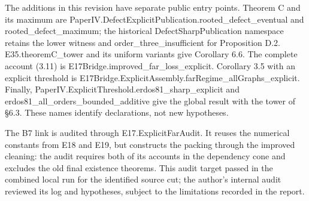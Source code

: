 \documentclass[english,11pt,a4paper]{article}
\begin{document}
The additions in this revision have separate public entry points. Theorem C and its maximum are {\ttfamily\small PaperIV.\discretionary{\hbox{\ensuremath{\hookrightarrow}}}{}{}DefectExplic\discretionary{\hbox{\ensuremath{\hookrightarrow}}}{}{}itPublicatio\discretionary{\hbox{\ensuremath{\hookrightarrow}}}{}{}n.\discretionary{\hbox{\ensuremath{\hookrightarrow}}}{}{}rooted\_\discretionary{\hbox{\ensuremath{\hookrightarrow}}}{}{}defect\_\discretionary{\hbox{\ensuremath{\hookrightarrow}}}{}{}eventual} and {\ttfamily\small rooted\_\discretionary{\hbox{\ensuremath{\hookrightarrow}}}{}{}defect\_\discretionary{\hbox{\ensuremath{\hookrightarrow}}}{}{}maximum}; the historical DefectSharpPublication namespace retains the lower witness and {\ttfamily\small order\_\discretionary{\hbox{\ensuremath{\hookrightarrow}}}{}{}three\_\discretionary{\hbox{\ensuremath{\hookrightarrow}}}{}{}insufficient} for Proposition D.2. {\ttfamily\small E35.\discretionary{\hbox{\ensuremath{\hookrightarrow}}}{}{}theoremC\_\discretionary{\hbox{\ensuremath{\hookrightarrow}}}{}{}tower} and its uniform variants give Corollary 6.6. The complete account (3.11) is {\ttfamily\small E17Bridge.\discretionary{\hbox{\ensuremath{\hookrightarrow}}}{}{}improved\_\discretionary{\hbox{\ensuremath{\hookrightarrow}}}{}{}far\_\discretionary{\hbox{\ensuremath{\hookrightarrow}}}{}{}loss\_\discretionary{\hbox{\ensuremath{\hookrightarrow}}}{}{}explicit}. Corollary 3.5 with an explicit threshold is {\ttfamily\small E17Bridge.\discretionary{\hbox{\ensuremath{\hookrightarrow}}}{}{}ExplicitAsse\discretionary{\hbox{\ensuremath{\hookrightarrow}}}{}{}mbly.\discretionary{\hbox{\ensuremath{\hookrightarrow}}}{}{}farRegime\_\discretionary{\hbox{\ensuremath{\hookrightarrow}}}{}{}allGraphs\_\discretionary{\hbox{\ensuremath{\hookrightarrow}}}{}{}explicit}. Finally, {\ttfamily\small PaperIV.\discretionary{\hbox{\ensuremath{\hookrightarrow}}}{}{}ExplicitThre\discretionary{\hbox{\ensuremath{\hookrightarrow}}}{}{}shold.\discretionary{\hbox{\ensuremath{\hookrightarrow}}}{}{}erdos81\_\discretionary{\hbox{\ensuremath{\hookrightarrow}}}{}{}sharp\_\discretionary{\hbox{\ensuremath{\hookrightarrow}}}{}{}explicit} and {\ttfamily\small erdos81\_\discretionary{\hbox{\ensuremath{\hookrightarrow}}}{}{}all\_\discretionary{\hbox{\ensuremath{\hookrightarrow}}}{}{}orders\_\discretionary{\hbox{\ensuremath{\hookrightarrow}}}{}{}bounded\_\discretionary{\hbox{\ensuremath{\hookrightarrow}}}{}{}additive} give the global result with the tower of §6.3. These names identify declarations, not new hypotheses.

The B7 link is audited through {\ttfamily\small E17.\discretionary{\hbox{\ensuremath{\hookrightarrow}}}{}{}ExplicitFarA\discretionary{\hbox{\ensuremath{\hookrightarrow}}}{}{}udit}. It reuses the numerical constants from {\ttfamily\small E18} and {\ttfamily\small E19}, but constructs the packing through the improved cleaning: the audit requires both of its accounts in the dependency cone and excludes the old final existence theorems. This audit target passed in the combined local run for the identified source cut; the author's internal audit reviewed its log and hypotheses, subject to the limitations recorded in the report.
\end{document}
